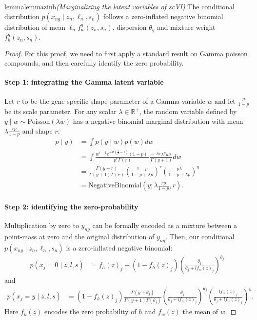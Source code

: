 \begin{restatable}{lemma}{lemmazinb}\emph{(Marginalizing the latent variables of scVI)}\label{lemma:zinb}
    The conditional distribution $p(x_{ng} \mid z_{n}, \ell_{n}, s_n)$ follows a zero-inflated negative binomial distribution of mean $\ell_{n}f^g_w(z_n, s_n)$, dispersion $\theta_g$ and mixture weight $f^g_h(z_n, s_n)$.
    \end{restatable}
\begin{proof}
    For this proof, we need to first apply a standard result on Gamma poisson compounds, and then carefully identify the zero probability. 
    \paragraph{Step 1: integrating the Gamma latent variable} Let $r$ to be the gene-specific shape parameter of a Gamma variable $w$ and let $\frac{p}{1-p}$ be its scale parameter. For any scalar $\lambda \in \mathbb{R}^+$, the random variable defined by $y \mid w \sim \textrm{Poisson}(\lambda w)$ has a negative binomial marginal distribution with mean $\lambda\frac{rp}{1-p}$ and shape $r$:
\begin{align}
 p(y) &= \int p(y \mid w) p(w)dw  \\
 &= \int \frac{w^{r-1} e^{-w(\frac{1}{p}-1)}(1-p)^r}{p^r\Gamma(r)}\frac{e^{-\lambda w} \lambda^y w^y}{\Gamma(y+1)}dw \\
&= \frac{\Gamma(y + r)}{\Gamma(y+1)\Gamma(r)} \left(\frac{1-p}{1-p + \lambda p} \right)^r \left(\frac{p\lambda}{1-p + \lambda p} \right)^y \\
&= \textrm{NegativeBinomial}\left(y; \lambda\frac{rp}{1-p}, r\right).
\end{align}
\paragraph{Step 2: identifying the zero-probability}
Multiplication by zero to $y_{ng}$ can be formally encoded as a mixture between a point-mass at zero and the original distribution of $y_{ng}$. Then, our conditional $p(x_{ng} \mid z_{n}, \ell_{n}, s_n)$ is a zero-inflated negative binomial:
\begin{align}
       p(x_j = 0 \mid z, l, s) &= f_h(z)_j + (1 - f_h(z)_j) \left( \frac{\theta_j}{\theta_j + l f_w(z)_j } \right)^{\theta_j}
\end{align}
and
\begin{align}
      p(x_j = y \mid z, l, s) &= (1-f_h(z)_j) \frac{\Gamma(y + \theta_j)}{\Gamma(y+1)\Gamma(\theta_j)} \left( \frac{\theta_j}{\theta_j + l f_w(z)_j } \right)^{\theta_j} \left( \frac{lf_w(z)_j}{\theta_j + l f_w(z)_j } \right)^y.
\end{align}
Here $f_h(z)$ encodes the zero probability of $h$ and $f_w(z)$ the mean of $w$.
\end{proof}

